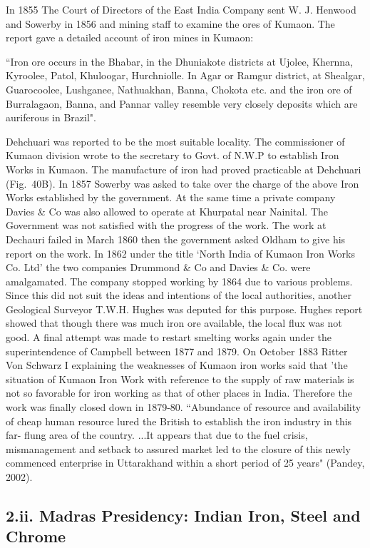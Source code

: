In 1855 The Court of Directors of the East India Company sent W. J. Henwood and Sowerby in 1856 and mining staff to examine the ores of Kumaon. The report gave a detailed account of iron mines in Kumaon:

``Iron ore occurs in the Bhabar, in the Dhuniakote districts at Ujolee, Khernna, Kyroolee, Patol, Khuloogar, Hurchniolle. In Agar or Ramgur district, at Shealgar, Guarocoolee, Lushganee, Nathuakhan, Banna, Chokota etc. and the iron ore of Burralagaon, Banna, and Pannar valley resemble very closely deposits which are auriferous in Brazil".

Dehchuari was reported to be the most suitable locality. The commissioner of Kumaon division wrote to the secretary to Govt. of N.W.P to establish Iron Works in Kumaon. The manufacture of iron had proved practicable at Dehchuari (Fig.~40B). In 1857 Sowerby was asked to take over the charge of the above Iron Works established by the government. At the same time a private company Davies \& Co was also allowed to operate at Khurpatal near Nainital. The Government was not satisfied with the progress of the work. The work at Dechauri failed in March 1860 then the government asked Oldham to give his report on the work. In 1862 under the title `North India of Kumaon Iron Works Co. Ltd' the two companies Drummond \& Co and Davies \& Co. were amalgamated. The company stopped working by 1864 due to various problems. Since this did not suit the ideas and intentions of the local authorities, another Geological Surveyor T.W.H. Hughes was deputed for this purpose. Hughes report showed that though there was much iron ore available, the local flux was not good. A final attempt was made to restart smelting works again under the superintendence of Campbell between 1877 and 1879. On October 1883 Ritter Von Schwarz I explaining the weaknesses of Kumaon iron works said that 'the situation of Kumaon Iron Work with reference to the supply of raw materials is not so favorable for iron working as that of other places in India. Therefore the work was finally closed down in 1879-80. ``Abundance of resource and availability of cheap human resource lured the British to establish the iron industry in this far- flung area of the country. ...It appears that due to the fuel crisis, mismanagement and setback to assured market led to the closure of this newly commenced enterprise in Uttarakhand within a short period of 25 years" (Pandey, 2002).

\subsection*{2.ii.  Madras Presidency: Indian Iron, Steel and Chrome}

